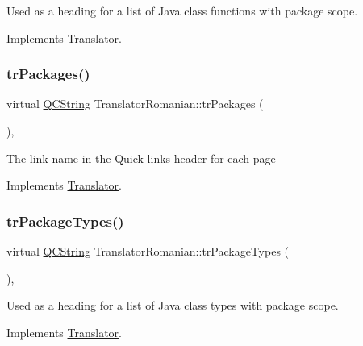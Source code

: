 Used as a heading for a list of Java class functions with package scope. 

Implements \mbox{\hyperlink{class_translator}{Translator}}.

\mbox{\label{class_translator_romanian_a95301c709e857addb69dfa02cf466f2e}} 
\subsubsection{\texorpdfstring{trPackages()}{trPackages()}}
{\footnotesize\ttfamily virtual \mbox{\hyperlink{class_q_c_string}{Q\+C\+String}} Translator\+Romanian\+::tr\+Packages (\begin{DoxyParamCaption}{ }\end{DoxyParamCaption})\hspace{0.3cm}{\ttfamily [inline]}, {\ttfamily [virtual]}}

The link name in the Quick links header for each page 

Implements \mbox{\hyperlink{class_translator}{Translator}}.

\mbox{\label{class_translator_romanian_a59e9fe04abf0b6ad6b53f9698c15675f}} 
\subsubsection{\texorpdfstring{trPackageTypes()}{trPackageTypes()}}
{\footnotesize\ttfamily virtual \mbox{\hyperlink{class_q_c_string}{Q\+C\+String}} Translator\+Romanian\+::tr\+Package\+Types (\begin{DoxyParamCaption}{ }\end{DoxyParamCaption})\hspace{0.3cm}{\ttfamily [inline]}, {\ttfamily [virtual]}}

Used as a heading for a list of Java class types with package scope. 

Implements \mbox{\hyperlink{class_translator}{Translator}}.

\mbox{\label{class_translator_romanian_a6858426987ca006c90929d6bdd7c572b}} 
